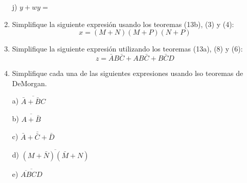 \documentclass[a4paper, 12pt]{article}
\newcommand{\Aspace}{0.2cm}
\begin{document}
\begin{enumerate}
            \vspace{\Aspace} \par
            j) $y + wy = $
            { \color{azul}  }



        \item Simplifique la siguiente expresión usando los teoremas (13b), (3) y (4):
        \[ x = (M + N)(M + P)(N + P)\]
            \vspace{\Aspace} \par
            { \color{azul}  }


        
        \item Simplifique la siguiente expresión utilizando los teoremas (13a), (8) y (6):
        \[ z = \bar{A}B\bar{C} + AB\bar{C} + B\bar{C}D \]
            \vspace{\Aspace} \par
            { \color{azul}  }



        \item Simplifique cada una de las siguientes expresiones usando lso teoremas de DeMorgan.
            \vspace{\Aspace} \par
            a) $\overline{\bar{A} + \bar{B}C}$
            \\ { \color{azul}  }

            \vspace{\Aspace} \par
            b) $\overline{A + \bar{B}}$
            \\ { \color{azul}  }

            \vspace{\Aspace} \par
            c) $\overline{\bar{A} + \bar{C} + \bar{D}}$
            \\ { \color{azul}  }

            \vspace{\Aspace} \par
            d) $\overline{(M + \bar{N})(\bar{M} + N)}$
            \\ { \color{azul}  }

            \vspace{\Aspace} \par
            e) $\overline{\overline{AB}CD}$
            \\ { \color{azul}  }




\end{enumerate}
\end{document}
